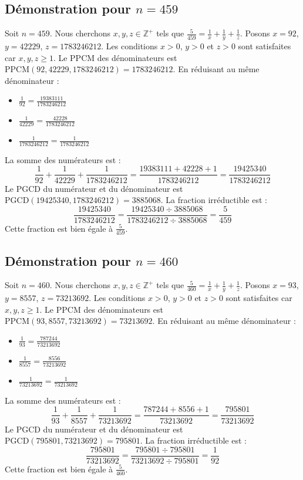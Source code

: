 \documentclass[11pt,a4paper]{article}
\begin{document}
\subsection{Démonstration pour $n = 459$}
Soit $n = 459$. Nous cherchons $x, y, z \in \mathbb{Z}^{+}$ tels que $\frac{5}{459} = \frac{1}{x} + \frac{1}{y} + \frac{1}{z}$.
Posons $x = 92$, $y = 42229$, $z = 1783246212$.
Les conditions $x > 0$, $y > 0$ et $z > 0$ sont satisfaites car $x, y, z \geq 1$.
Le PPCM des dénominateurs est $\text{PPCM}(92, 42229, 1783246212) = 1783246212$.
En réduisant au même dénominateur :
\begin{itemize}
    \item $\frac{1}{92} = \frac{19383111}{1783246212}$
    \item $\frac{1}{42229} = \frac{42228}{1783246212}$
    \item $\frac{1}{1783246212} = \frac{1}{1783246212}$
\end{itemize}
La somme des numérateurs est :
$$ \frac{1}{92} + \frac{1}{42229} + \frac{1}{1783246212} = \frac{19383111 + 42228 + 1}{1783246212} = \frac{19425340}{1783246212} $$
Le PGCD du numérateur et du dénominateur est $\text{PGCD}(19425340, 1783246212) = 3885068$.
La fraction irréductible est :
$$ \frac{19425340}{1783246212} = \frac{19425340 \div 3885068}{1783246212 \div 3885068} = \frac{5}{459} $$
Cette fraction est bien égale à $\frac{5}{459}$.

\subsection{Démonstration pour $n = 460$}
Soit $n = 460$. Nous cherchons $x, y, z \in \mathbb{Z}^{+}$ tels que $\frac{5}{460} = \frac{1}{x} + \frac{1}{y} + \frac{1}{z}$.
Posons $x = 93$, $y = 8557$, $z = 73213692$.
Les conditions $x > 0$, $y > 0$ et $z > 0$ sont satisfaites car $x, y, z \geq 1$.
Le PPCM des dénominateurs est $\text{PPCM}(93, 8557, 73213692) = 73213692$.
En réduisant au même dénominateur :
\begin{itemize}
    \item $\frac{1}{93} = \frac{787244}{73213692}$
    \item $\frac{1}{8557} = \frac{8556}{73213692}$
    \item $\frac{1}{73213692} = \frac{1}{73213692}$
\end{itemize}
La somme des numérateurs est :
$$ \frac{1}{93} + \frac{1}{8557} + \frac{1}{73213692} = \frac{787244 + 8556 + 1}{73213692} = \frac{795801}{73213692} $$
Le PGCD du numérateur et du dénominateur est $\text{PGCD}(795801, 73213692) = 795801$.
La fraction irréductible est :
$$ \frac{795801}{73213692} = \frac{795801 \div 795801}{73213692 \div 795801} = \frac{1}{92} $$
Cette fraction est bien égale à $\frac{5}{460}$.
\end{document}
